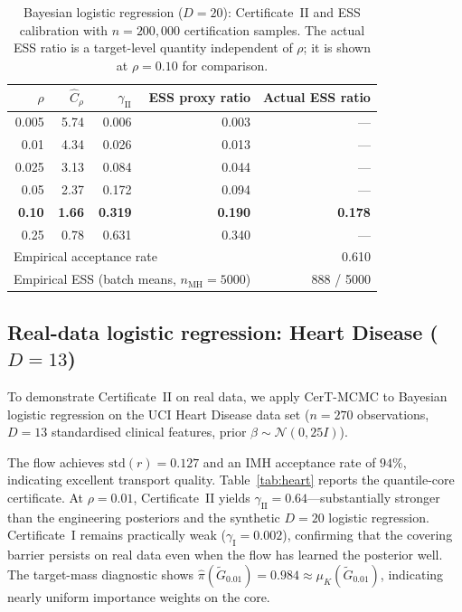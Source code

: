 \documentclass[12pt]{article}
\begin{document}
\begin{table}[t]
\centering
\caption{Bayesian logistic regression ($D=20$): Certificate~II and ESS calibration with $n = 200{,}000$ certification samples. The actual ESS ratio is a target-level quantity independent of $\rho$; it is shown at $\rho = 0.10$ for comparison.}
\label{tab:logreg}
\begin{tabular}{rrrrr}
\toprule
$\rho$ & $\hat{C}_\rho$ & $\gamma_{\mathrm{II}}$ & ESS proxy ratio & Actual ESS ratio \\
\midrule
0.005 & 5.74 & 0.006 & 0.003 & --- \\
0.01  & 4.34 & 0.026 & 0.013 & --- \\
0.025 & 3.13 & 0.084 & 0.044 & --- \\
0.05  & 2.37 & 0.172 & 0.094 & --- \\
\textbf{0.10}  & \textbf{1.66} & \textbf{0.319} & \textbf{0.190} & \textbf{0.178} \\
0.25  & 0.78 & 0.631 & 0.340 & --- \\
\midrule
\multicolumn{4}{l}{Empirical acceptance rate} & 0.610 \\
\multicolumn{4}{l}{Empirical ESS (batch means, $n_{\mathrm{MH}} = 5000$)} & 888 / 5000 \\
\bottomrule
\end{tabular}
\end{table}


\subsection{Real-data logistic regression: Heart Disease ($D = 13$)}\label{sec:heart}

To demonstrate Certificate~II on real data, we apply CerT-MCMC to Bayesian logistic regression on the UCI Heart Disease data set \citep{Detrano1989} ($n = 270$ observations, $D = 13$ standardised clinical features, prior $\beta \sim \mathcal{N}(0, 25I)$).

The flow achieves $\mathrm{std}(r) = 0.127$ and an IMH acceptance rate of $94\%$, indicating excellent transport quality. Table~\ref{tab:heart} reports the quantile-core certificate. At $\rho = 0.01$, Certificate~II yields $\gamma_{\mathrm{II}} = 0.64$---substantially stronger than the engineering posteriors and the synthetic $D = 20$ logistic regression. Certificate~I remains practically weak ($\gamma_{\mathrm{I}} = 0.002$), confirming that the covering barrier persists on real data even when the flow has learned the posterior well. The target-mass diagnostic shows $\hat{\pi}(\tilde{G}_{0.01}) = 0.984 \approx \mu_K(\tilde{G}_{0.01})$, indicating nearly uniform importance weights on the core.
\end{document}

